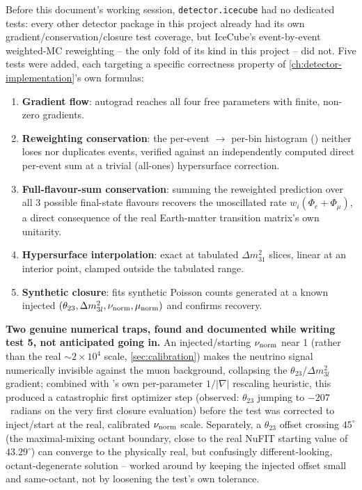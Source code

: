 \begin{theorybox}
Before this document's working session, \texttt{detector.icecube} had no
dedicated tests: every other detector package in this project already had
its own gradient/conservation/closure test coverage, but IceCube's
event-by-event weighted-MC reweighting -- the only fold of its kind in
this project -- did not. Five tests were added, each targeting a specific
correctness property of \cref{ch:detector-implementation}'s own formulas:
\begin{enumerate}
  \item \textbf{Gradient flow}: autograd reaches all four free parameters
    with finite, non-zero gradients.
  \item \textbf{Reweighting conservation}: the per-event $\to$ per-bin
    histogram () neither loses nor duplicates
    events, verified against an independently computed direct per-event
    sum at a trivial (all-ones) hypersurface correction.
  \item \textbf{Full-flavour-sum conservation}: summing the reweighted
    prediction over all 3 possible final-state flavours recovers the
    unoscillated rate $w_i(\Phi_e+\Phi_\mu)$, a direct consequence of the
    real Earth-matter transition matrix's own unitarity.
  \item \textbf{Hypersurface interpolation}: exact at tabulated
    $\Delta m^2_{31}$ slices, linear at an interior point, clamped outside
    the tabulated range.
  \item \textbf{Synthetic closure}: fits synthetic Poisson counts
    generated at a known injected $(\theta_{23},\Delta m^2_{3l},\nu_{\rm norm},
    \mu_{\rm norm})$ and confirms recovery.
\end{enumerate}
\end{theorybox}

\begin{notebox}
\textbf{Two genuine numerical traps, found and documented while writing
test 5, not anticipated going in.} An injected/starting $\nu_{\rm norm}$
near 1 (rather than the real $\sim2\times10^4$ scale,
\cref{sec:calibration}) makes the neutrino signal numerically invisible
against the muon background, collapsing the $\theta_{23}$/$\Delta
m^2_{3l}$ gradient; combined with 's own
per-parameter $1/|\nabla|$ rescaling heuristic, this produced a
catastrophic first optimizer step (observed: $\theta_{23}$ jumping to
$-207$~radians on the very first closure evaluation) before the test was
corrected to inject/start at the real, calibrated $\nu_{\rm norm}$ scale.
Separately, a $\theta_{23}$ offset crossing $45^\circ$ (the maximal-mixing
octant boundary, close to the real NuFIT starting value of $43.29^\circ$)
can converge to the physically real, but confusingly different-looking,
octant-degenerate solution -- worked around by keeping the injected
offset small and same-octant, not by loosening the test's own tolerance.
\end{notebox}

